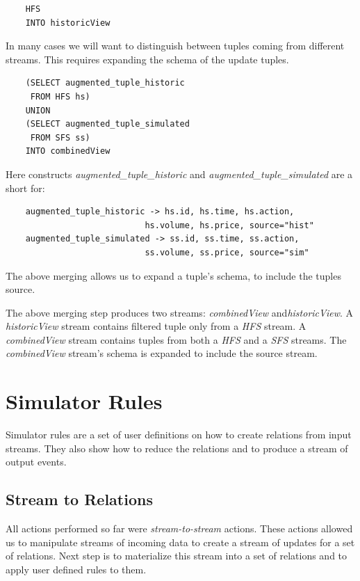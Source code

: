 \documentclass{article}
\begin{document}
\begin{verbatim}  
    HFS
    INTO historicView
\end{verbatim}


In many cases we will want to distinguish between tuples coming from different streams. This requires expanding the schema of the update tuples. 

\begin{verbatim}  
    (SELECT augmented_tuple_historic
     FROM HFS hs)
    UNION
    (SELECT augmented_tuple_simulated
     FROM SFS ss)
    INTO combinedView
\end{verbatim}

Here constructs \emph{augmented\_tuple\_historic} and \emph{augmented\_tuple\_simulated} are a short for:

\begin{verbatim}
    augmented_tuple_historic -> hs.id, hs.time, hs.action,
                            hs.volume, hs.price, source="hist"
    augmented_tuple_simulated -> ss.id, ss.time, ss.action,
                            ss.volume, ss.price, source="sim"
\end{verbatim}

The above merging allows us to expand a tuple's schema, to include the tuples source. 

The above merging step produces two streams: \emph{combinedView} and\emph{historicView}. A \emph{historicView} stream contains filtered tuple only from a \emph{HFS} stream. A \emph{combinedView} stream contains tuples from both a \emph{HFS} and a \emph{SFS} streams. The \emph{combinedView} stream's schema is expanded to include the source stream.


\section{Simulator Rules}

Simulator rules are a set of user definitions on how to create relations from input streams. They also show how to reduce the relations and to produce a stream of output events.

\subsection{Stream to Relations}
All actions performed so far were \emph{stream-to-stream} actions. These actions allowed us to manipulate streams of incoming data to create a stream of updates for a set of relations. Next step is to materialize this stream into a set of relations and to apply user defined rules to them. 
\end{document}
